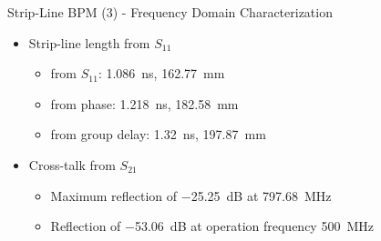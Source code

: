 \documentclass{beamer}
\begin{document}
\begin{frame}[t,fragile]{Strip-Line BPM (3) - Frequency Domain Characterization}
\begin{itemize}
\item Strip-line length from $S_{11}$
\begin{itemize}
\item from $S_{11}$: \SI{1.086}{\nano\second}, \SI{162.77}{\mm}
\item from phase: \SI{1.218}{\nano\second}, \SI{182.58}{\mm}
\item from group delay: \SI{1.32}{\nano\second}, \SI{197.87}{\mm}
\end{itemize}
\item Cross-talk from $S_{21}$
\begin{itemize}
\item Maximum reflection of \SI{-25.25}{\dB} at \SI{797.68}{\MHz}
\item Reflection of \SI{-53.06}{\dB} at operation frequency \SI{500}{\MHz}
\end{itemize}
\end{itemize}

\begin{figure}
  \centering\setcounter{subfigure}{0}
  \quad
  \\
\end{figure}

\end{frame}
\end{document}
